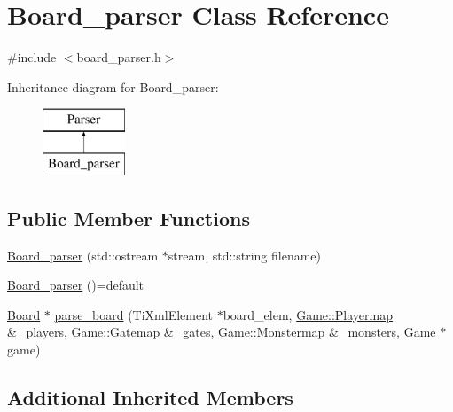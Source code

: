 \hypertarget{class_board__parser}{\section{Board\-\_\-parser Class Reference}
\label{class_board__parser}
}


{\ttfamily \#include $<$board\-\_\-parser.\-h$>$}

Inheritance diagram for Board\-\_\-parser\-:\begin{figure}[H]
\begin{center}
\leavevmode
\includegraphics[height=2.000000cm]{class_board__parser}
\end{center}
\end{figure}
\subsection*{Public Member Functions}
\begin{DoxyCompactItemize}
\item 
\hyperlink{class_board__parser_ac319ba5a336e36cfa2415119d879a9d2}{Board\-\_\-parser} (std\-::ostream $\ast$stream, std\-::string filename)
\item 
\hyperlink{class_board__parser_a99271ae26b210b3624c67aeab38033ae}{Board\-\_\-parser} ()=default
\item 
\hyperlink{class_board}{Board} $\ast$ \hyperlink{class_board__parser_a31ec31613ebf8aedb0c8b7fc01c58ffa}{parse\-\_\-board} (Ti\-Xml\-Element $\ast$board\-\_\-elem, \hyperlink{class_game_a11e553861e3a7fc842680e55171ed06f}{Game\-::\-Playermap} \&\-\_\-players, \hyperlink{class_game_a3ac788aaa1e70509a9b9745acd17a8b5}{Game\-::\-Gatemap} \&\-\_\-gates, \hyperlink{class_game_a2c39481e575abd66baa206771c504149}{Game\-::\-Monstermap} \&\-\_\-monsters, \hyperlink{class_game}{Game} $\ast$game)
\end{DoxyCompactItemize}
\subsection*{Additional Inherited Members}


